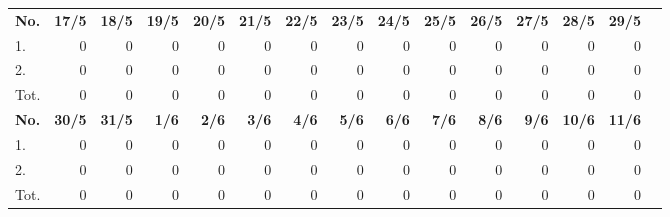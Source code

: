 \documentclass{article}
\begin{document}
\begin{table}[H]
    \centering
    \begin{tabularx}{\textwidth}{| X | r | r | r | r | r | r | r | r | r | r | r | r | r | r |}
        \Xhline{2pt}
        \textbf{No.} & \textbf{17/5} & \textbf{18/5} & \textbf{19/5} & \textbf{20/5} & \textbf{21/5} & \textbf{22/5} & \textbf{23/5} & \textbf{24/5} & \textbf{25/5} & \textbf{26/5} & \textbf{27/5} & \textbf{28/5} & \textbf{29/5} \\
        \Xhline{2pt}
        1. & 0 & 0 & 0 & 0 & 0 & 0 & 0 & 0 & 0 & 0 & 0 & 0 & 0 \\
        \hline
        2. & 0 & 0 & 0 & 0 & 0 & 0 & 0 & 0 & 0 & 0 & 0 & 0 & 0 \\
        \hline
        Tot. & 0 & 0 & 0 & 0 & 0 & 0 & 0 & 0 & 0 & 0 & 0 & 0 & 0 \\
        \Xhline{2pt}
        \textbf{No.} & \textbf{30/5} & \textbf{31/5} & \textbf{ 1/6} & \textbf{ 2/6} & \textbf{ 3/6} & \textbf{ 4/6} & \textbf{ 5/6} & \textbf{ 6/6} & \textbf{ 7/6} & \textbf{ 8/6} & \textbf{ 9/6} & \textbf{10/6} & \textbf{11/6} \\
        \Xhline{2pt}
        1. & 0 & 0 & 0 & 0 & 0 & 0 & 0 & 0 & 0 & 0 & 0 & 0 & 0 \\
        \hline
        2. & 0 & 0 & 0 & 0 & 0 & 0 & 0 & 0 & 0 & 0 & 0 & 0 & 0 \\
        \hline
        Tot. & 0 & 0 & 0 & 0 & 0 & 0 & 0 & 0 & 0 & 0 & 0 & 0 & 0 \\
        \hline
    \end{tabularx}
\end{table}

\clearpage
\end{document}
